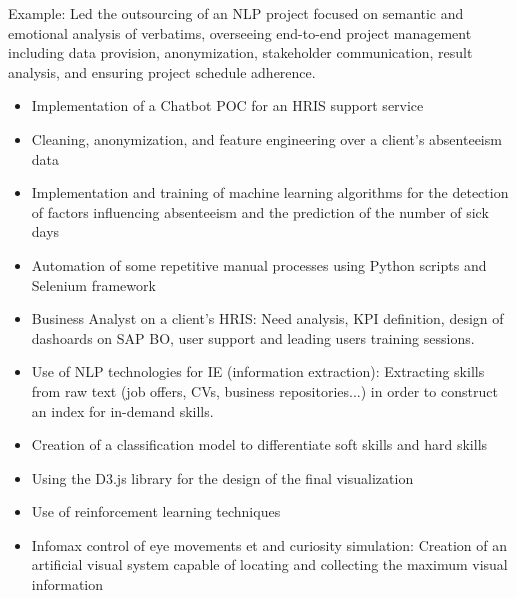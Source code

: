 \documentclass[10pt,letter,ragged2e,withhyper]{altacv}
\renewcommand{\divider}{\vspace{-0.2cm}\textcolor{body!30}{\hdashrule{\linewidth}{0.6pt}{0.5ex}}\smallskip\vspace{-0.1cm}} %
\begin{document}
\begin{paracol}{2}
\begin{itemize}
 Example: Led the outsourcing of an NLP project focused on semantic and emotional analysis of verbatims, overseeing end-to-end project management including data provision, anonymization, stakeholder communication, result analysis, and ensuring project schedule adherence.
\end{itemize}

\divider\smallskip
{}

\begin{itemize}
\end{itemize}

\divider\smallskip
{}

\begin{itemize}
  \item Implementation of a Chatbot POC for an HRIS support service
  \item Cleaning, anonymization, and feature engineering over a client's absenteeism data
  \item Implementation and training of machine learning algorithms for the detection of factors influencing absenteeism and the prediction of the number of sick days
  \item Automation of some repetitive manual processes using Python scripts and Selenium framework
  \item Business Analyst on a client's HRIS: Need analysis, KPI definition, design of dashoards on SAP BO, user support and leading users training sessions.
  \item Use of NLP technologies for IE (information extraction): Extracting skills from raw text (job offers, CVs, business repositories...) in order to construct an index for in-demand skills.
  \item Creation of a classification model to differentiate soft skills and hard skills
  \item Using the D3.js library for the design of the final visualization
\end{itemize}

\divider\smallskip
{}

\begin{itemize}
  \item Use of reinforcement learning techniques
  \item Infomax control of eye movements et and curiosity simulation: Creation of an artificial visual system capable of locating and collecting the maximum visual information
\end{itemize}




\end{paracol}
\end{document}
